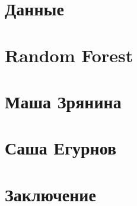 \documentclass[12pt,a4paper]{article}
\begin{document}
\section{Данные}

\section{Random Forest}

\section{Маша Зрянина}

\section{Саша Егурнов}

\section{Заключение}



\end{document}

